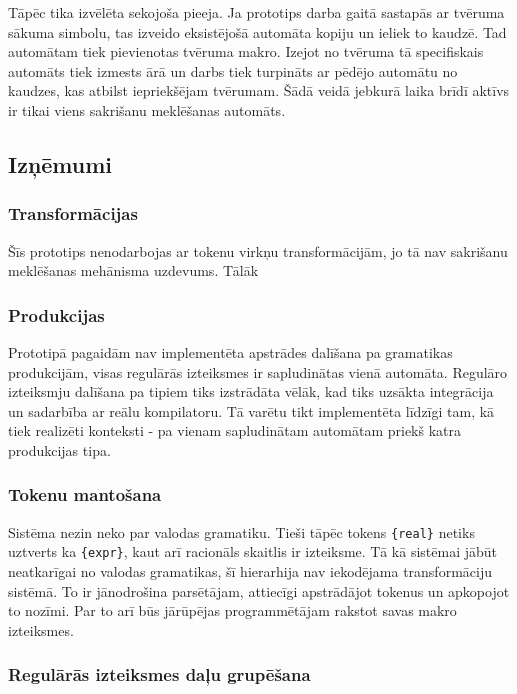 Tāpēc tika izvēlēta sekojoša pieeja. Ja prototips darba gaitā sastapās ar tvēruma sākuma simbolu, tas izveido eksistējošā automāta kopiju un ieliek to kaudzē. Tad automātam tiek pievienotas tvēruma makro. Izejot no tvēruma tā specifiskais automāts tiek izmests ārā un darbs tiek turpināts ar pēdējo automātu no kaudzes, kas atbilst iepriekšējam tvērumam. Šādā veidā jebkurā laika brīdī aktīvs ir tikai viens sakrišanu meklēšanas automāts.

\subsection{\label{subsec:solution_problems}Izņēmumi}

\subsubsection{Transformācijas}
Šīs prototips nenodarbojas ar tokenu virkņu transformācijām, jo tā nav sakrišanu meklēšanas mehānisma uzdevums. Tālāk 

\subsubsection{Produkcijas}
Prototipā pagaidām nav implementēta apstrādes dalīšana pa gramatikas produkcijām, visas regulārās izteiksmes ir sapludinātas vienā automāta. Regulāro izteiksmju dalīšana pa tipiem tiks izstrādāta vēlāk, kad tiks uzsākta integrācija un sadarbība ar reālu kompilatoru. Tā varētu tikt implementēta līdzīgi tam, kā tiek realizēti konteksti - pa vienam sapludinātam automātam priekš katra produkcijas tipa.

\subsubsection{Tokenu mantošana}
Sistēma nezin neko par valodas gramatiku. Tieši tāpēc tokens \verb|{real}| netiks uztverts ka \verb|{expr}|, kaut arī racionāls skaitlis ir izteiksme. Tā kā sistēmai jābūt neatkarīgai no valodas gramatikas, šī hierarhija nav iekodējama transformāciju sistēmā. To ir jānodrošina parsētājam, attiecīgi apstrādājot tokenus un apkopojot to nozīmi. Par to arī būs jārūpējas programmētājam rakstot savas makro izteiksmes.

\subsubsection{Regulārās izteiksmes daļu grupēšana}

